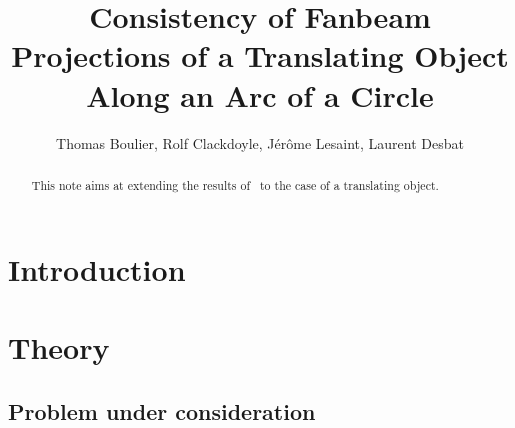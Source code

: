 \documentclass[9pt,technote]{IEEEtran}
\title{Consistency of Fanbeam Projections of a Translating Object Along an Arc of a Circle}
\author{Thomas Boulier, Rolf Clackdoyle, Jérôme Lesaint, Laurent Desbat}
\date{}
\numberwithin{equation}{section}
\begin{document}
\maketitle

\begin{abstract}
This note aims at extending the results of~\cite{clackdoyle2015consistency} to the case of a translating object.
\end{abstract}

\section{Introduction}

\section{Theory} 
\label{sec:theory}

\subsection{Problem under consideration}
\label{sub:problem_under_consideration}
\end{document}
